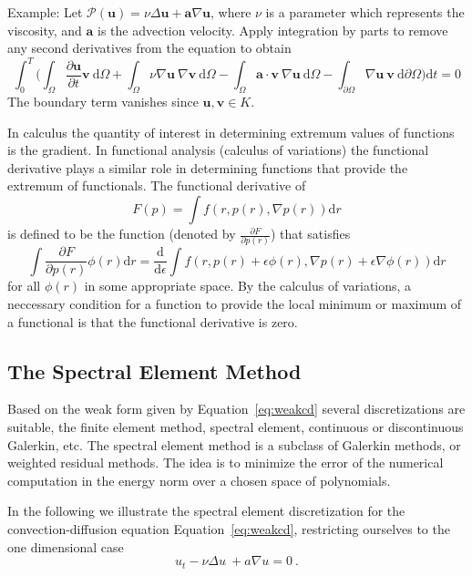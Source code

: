 \documentclass[10pt]{article}
\renewcommand{\d}{\mathrm{d}}
\begin{document}
Example: Let $\mathcal P(\mathbf u) = \nu \Delta \mathbf u + \mathbf a  \nabla \mathbf u$, where $\nu$ is a parameter which represents the viscosity, and $\mathbf a$ is the advection velocity. Apply integration by parts to remove any second derivatives from the equation to obtain
\begin{equation}
\int_0^T \bigg( \int_{\Omega}\frac{\partial\mathbf u}{\partial t} \mathbf v \ \d \Omega + \int_{\Omega} \nu\nabla \mathbf u\ \nabla \mathbf v\ \d \Omega - \int_{\Omega} \mathbf a \cdot \mathbf v\ \nabla \mathbf u\ \d \Omega-
 \int_{\partial \Omega} \nabla \mathbf u \ \mathbf v\  \d \partial \Omega \bigg) \d t =0\label{eq:weakcd}
\end{equation}
The boundary term vanishes since $\mathbf u, \mathbf v \in K.$

In calculus the quantity of interest in determining extremum values of functions is the gradient. In functional analysis (calculus of variations) the functional
derivative plays a similar role in determining functions that provide the extremum of functionals. The functional derivative of
\[
F(p) = \int f(r,p(r),\nabla p(r)) \d r
\]
is defined to be the function (denoted by $ \frac{\partial F}{\partial p(r)}$) that satisfies
\[
\int \frac{\partial F}{\partial p(r)} \phi(r) \d r = \frac{\d}{\d \epsilon} \int f(r,p(r) + \epsilon \phi(r),\nabla p(r) + \epsilon \nabla \phi(r) ) \d r
\]
for all $ \phi(r)$ in some appropriate space. By the calculus of variations, a neccessary condition for a function to provide the local
minimum or maximum of a functional is that the functional derivative is zero.




\subsection{The Spectral Element Method}


Based on the weak form given by Equation~\ref{eq:weakcd} several discretizations are suitable, the finite element method, spectral element, continuous or discontinuous Galerkin, etc.
The spectral element method is a subclass of Galerkin methods, or weighted residual methods. 
The idea is to minimize the error of the numerical computation in the energy norm over a chosen space of polynomials. 

In the following we illustrate the spectral element discretization for the convection-diffusion equation Equation~\ref{eq:weakcd}, restricting ourselves to the one dimensional case
\begin{equation}
u_t - \nu\Delta u\ +a \nabla u=0\ . \label{eq:1dcd}
\end{equation}
\end{document}
